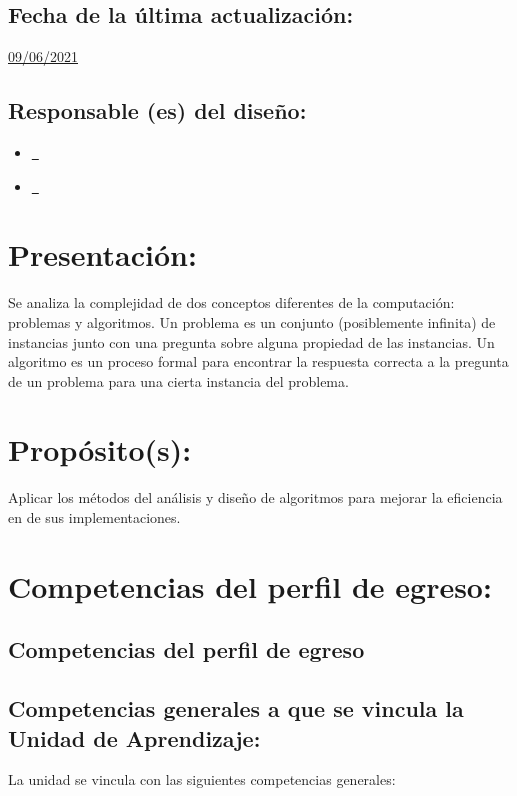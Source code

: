 \documentclass[10 pt]{article}
\begin{document}
\subsection{Fecha de la \'{u}ltima actualizaci\'{o}n:} \underline{09/06/2021}
\subsection{Responsable (es) del dise\~{n}o:}
\begin{itemize}[label={}]
\item \underline{\nferny~\ferny}
\item \underline{\nelisa~\elisa}
\end{itemize}
\newpage
\section{Presentaci\'{o}n:}

Se analiza la complejidad de dos conceptos diferentes de la
computaci\'{o}n: problemas y algoritmos. Un problema es un conjunto
(posiblemente infinita) de instancias junto con una pregunta sobre
alguna propiedad de las instancias.  Un algoritmo es un proceso formal
para encontrar la respuesta correcta a la pregunta de un problema para
una cierta instancia del problema.
  
\section{Prop\'{o}sito(s):}

Aplicar los m\'{e}todos del an\'{a}lisis y dise\~{n}o de algoritmos
para mejorar la eficiencia en de sus implementaciones.

\section{Competencias del perfil de egreso:}
\subsection{Competencias del perfil de egreso}



\subsection{Competencias generales a que se vincula la Unidad de
    Aprendizaje:}

  La unidad se vincula con las siguientes competencias generales:
\end{document}
